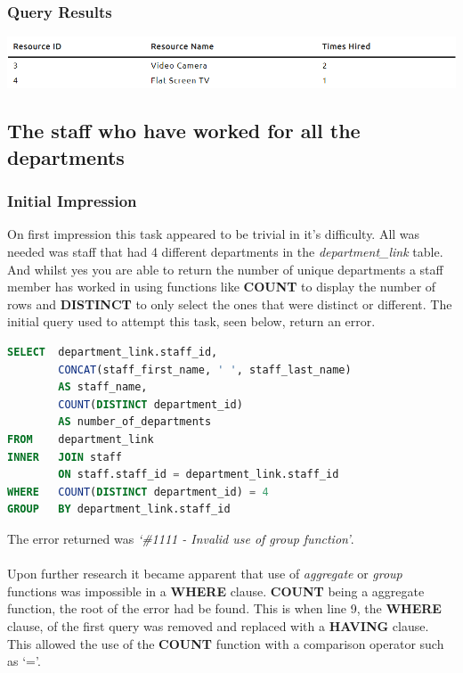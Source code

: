 \documentclass{article}
\begin{document}
\subsubsection{Query Results}
\includegraphics[width=\linewidth]{images/08.png}

\newpage

\subsection{The staff who have worked for all the departments}
\subsubsection{Initial Impression} On first impression this task appeared to be trivial in it's difficulty. All was needed was staff that had 4 different departments in the \textit{department\_link} table. And whilst yes you are able to return the number of unique departments a staff member has worked in using functions like \textbf{COUNT} to display the number of rows and \textbf{DISTINCT} to only select the ones that were distinct or different. The initial query used to attempt this task, seen below, return an error.

\begin{lstlisting}[language=sql, caption=The staff who have worked for all the departments Query First Attempt, style=mystyle]
SELECT  department_link.staff_id,
        CONCAT(staff_first_name, ' ', staff_last_name) 
        AS staff_name, 
        COUNT(DISTINCT department_id) 
        AS number_of_departments 
FROM    department_link
INNER   JOIN staff 
        ON staff.staff_id = department_link.staff_id
WHERE   COUNT(DISTINCT department_id) = 4
GROUP   BY department_link.staff_id
\end{lstlisting} 
The error returned was \textit{`\#1111 - Invalid use of group function'}.
\\\\
Upon further research it became apparent that use of \textit{aggregate} or \textit{group} functions was impossible in a \textbf{WHERE} clause. \textbf{COUNT} being a aggregate function, the root of the error had be found. This is when line 9, the \textbf{WHERE} clause, of the first query was removed and replaced with a \textbf{HAVING} clause. This allowed the use of the \textbf{COUNT} function with a comparison operator such as `='.
\end{document}
